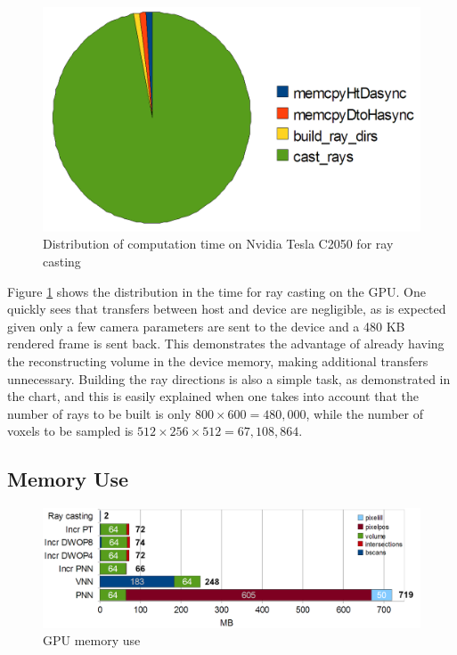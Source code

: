 	\begin{figure}[h]
	\centering
	\includegraphics[height=0.3\textheight]{charts/ray_casting.png}
	\caption[Distribution of computation time for ray casting]{Distribution of computation time on Nvidia Tesla C2050 for ray casting}
	\label{fig:ray_casting_pie}
	\end{figure}
	
	Figure \ref{fig:ray_casting_pie} shows the distribution in the time for ray casting on the GPU. One quickly sees that transfers between host and device are negligible, as is expected given only a few camera parameters are sent to the device and a 480 KB rendered frame is sent back. This demonstrates the advantage of already having the reconstructing volume in the device memory, making additional transfers unnecessary. Building the ray directions is also a simple task, as demonstrated in the chart, and this is easily explained when one takes into account that the number of rays to be built is only $800 \times 600 = 480,000$, while the number of voxels to be sampled is $512 \times 256 \times 512 = 67,108,864$.
	
\subsection{Memory Use}

	\begin{figure}[h]
	\centering
	\includegraphics[width=\textwidth]{charts/memory_use.png}
	\caption{GPU memory use}
	\label{fig:memory_use}
	\end{figure}
	
